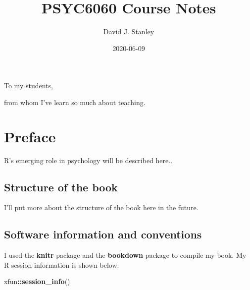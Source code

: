 \documentclass[
]{krantz}
\title{PSYC6060 Course Notes}
\author{David J. Stanley}
\date{2020-06-09}
\makeatletter
\newenvironment{Shaded}{\begin{snugshade}}{\end{snugshade}}
\newcommand{\KeywordTok}[1]{\textcolor[rgb]{0.27,0.27,0.27}{\textbf{#1}}}
\newcommand{\NormalTok}[1]{#1}
\newcommand{\OperatorTok}[1]{\textcolor[rgb]{0.43,0.43,0.43}{\textbf{#1}}}
\newenvironment{kframe}{%
\medskip{}
\setlength{\fboxsep}{.8em}
 \def\at@end@of@kframe{}%
 \ifinner\ifhmode%
  \def\at@end@of@kframe{\end{minipage}}%
  \begin{minipage}{\columnwidth}%
 \fi\fi%
 \def\FrameCommand##1{\hskip\@totalleftmargin \hskip-\fboxsep
 \colorbox{shadecolor}{##1}\hskip-\fboxsep
     \hskip-\linewidth \hskip-\@totalleftmargin \hskip\columnwidth}%
 \MakeFramed {\advance\hsize-\width
   \@totalleftmargin\z@ \linewidth\hsize
   \@setminipage}}%
 {\par\unskip\endMakeFramed%
 \at@end@of@kframe}
\renewenvironment{Shaded}{\begin{kframe}}{\end{kframe}}
\makeatother
\begin{document}
\maketitle


\thispagestyle{empty}

\begin{center}
To my students,

from whom I've learn so much about teaching.
\end{center}

\setlength{\abovedisplayskip}{-5pt}
\setlength{\abovedisplayshortskip}{-5pt}

{
\hypersetup{linkcolor=}
\setcounter{tocdepth}{2}
\tableofcontents
}
\listoftables
\listoffigures
\hypertarget{preface}{%
\chapter*{Preface}\label{preface}}


R's emerging role in psychology will be described here..

\hypertarget{structure-of-the-book}{%
\section*{Structure of the book}\label{structure-of-the-book}}


I'll put more about the structure of the book here in the future.

\hypertarget{software-information-and-conventions}{%
\section*{Software information and conventions}\label{software-information-and-conventions}}


I used the \textbf{knitr} package \citep{xie2015} and the \textbf{bookdown} package \citep{R-bookdown} to compile my book. My R session information is shown below:

\begin{Shaded}
\begin{Highlighting}[]
\NormalTok{xfun}\OperatorTok{::}\KeywordTok{session_info}\NormalTok{()}
\end{Highlighting}
\end{Shaded}
\end{document}
